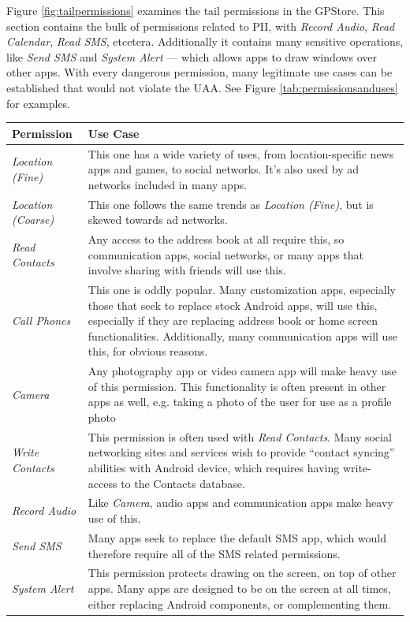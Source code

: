 Figure \ref{fig:tailpermissions} examines the tail permissions in the GPStore. This section contains the bulk of permissions related to PII, with \textit{Record Audio}, \textit{Read Calendar}, \textit{Read SMS}, etcetera. Additionally it contains many sensitive operations, like \textit{Send SMS} and \textit{System Alert} --- which allows apps to draw windows over other apps. With every dangerous permission, many legitimate use cases can be established that would not violate the UAA. See Figure \ref{tab:permissionsanduses} for examples.

\begin{table}[h]
\begin{small}
\begin{tabular}{p{3cm}|p{12.5cm}}
Permission & Use Case \\
\hline

\textit{Location (Fine)} & This one has a wide variety of uses, from location-specific news apps and games, to social networks. It's also used by ad networks included in many apps.  \\
\textit{Location (Coarse)} & This one follows the same trends as \textit{Location (Fine)}, but is skewed towards ad networks.  \\
\textit{Read Contacts} & Any access to the address book at all require this, so communication apps, social networks, or many apps that involve sharing with friends will use this.  \\
\textit{Call Phones} & This one is oddly popular. Many customization apps, especially those that seek to replace stock Android apps, will use this, especially if they are replacing address book or home screen functionalities. Additionally, many communication apps will use this, for obvious reasons.  \\
\textit{Camera} & Any photography app or video camera app will make heavy use of this permission. This functionality is often present in other apps as well, e.g. taking a photo of the user for use as a profile photo  \\
\textit{Write Contacts} & This permission is often used with \textit{Read Contacts}. Many social networking sites and services wish to provide ``contact syncing'' abilities with Android device, which requires having write-access to the Contacts database.  \\
\textit{Record Audio} & Like \textit{Camera}, audio apps and communication apps make heavy use of this.  \\
\textit{Send SMS} & Many apps seek to replace the default SMS app, which would therefore require all of the SMS related permissions.  \\
\textit{System Alert} & This permission protects drawing on the screen, on top of other apps. Many apps are designed to be on the screen at all times, either replacing Android components, or complementing them.  \\


\end{tabular}
\end{small}
\end{table}

